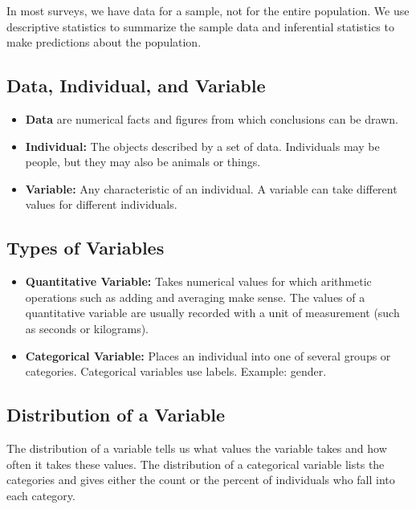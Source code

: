 In most surveys, we have data for a sample, not for the entire population. We use descriptive statistics to summarize the sample data and inferential statistics to make predictions about the population.

\subsection{Data, Individual, and Variable}
\begin{itemize}
    \item \textbf{Data} are numerical facts and figures from which conclusions can be drawn.
    \item \textbf{Individual:} The objects described by a set of data. Individuals may be people, but they may also be animals or things.
    \item \textbf{Variable:} Any characteristic of an individual. A variable can take different values for different individuals.
\end{itemize}

\subsection*{Types of Variables}
\begin{itemize}
    \item \textbf{Quantitative Variable:} Takes numerical values for which arithmetic operations such as adding and averaging make sense. The values of a quantitative variable are usually recorded with a unit of measurement (such as seconds or kilograms).
    \item \textbf{Categorical Variable:} Places an individual into one of several groups or categories. Categorical variables use labels. Example: gender.
\end{itemize}

\subsection*{Distribution of a Variable}
The distribution of a variable tells us what values the variable takes and how often it takes these values. The distribution of a categorical variable lists the categories and gives either the count or the percent of individuals who fall into each category.

